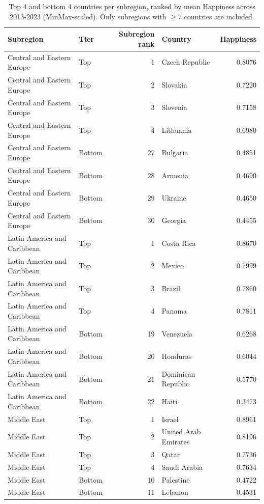 \begin{table}
\caption{Top 4 and bottom 4 countries per subregion, ranked by mean Happiness across 2013-2023 (MinMax-scaled). Only subregions with $\geq 7$ countries are included.}
\label{tab:top-bottom-sub}
\begin{tabular}{llrlr}
\toprule
Subregion & Tier & Subregion rank & Country & Happiness \\
\midrule
Central and Eastern Europe & Top & 1 & Czech Republic & 0.8076 \\
Central and Eastern Europe & Top & 2 & Slovakia & 0.7220 \\
Central and Eastern Europe & Top & 3 & Slovenia & 0.7158 \\
Central and Eastern Europe & Top & 4 & Lithuania & 0.6980 \\
Central and Eastern Europe & Bottom & 27 & Bulgaria & 0.4851 \\
Central and Eastern Europe & Bottom & 28 & Armenia & 0.4690 \\
Central and Eastern Europe & Bottom & 29 & Ukraine & 0.4650 \\
Central and Eastern Europe & Bottom & 30 & Georgia & 0.4455 \\
Latin America and Caribbean & Top & 1 & Costa Rica & 0.8670 \\
Latin America and Caribbean & Top & 2 & Mexico & 0.7999 \\
Latin America and Caribbean & Top & 3 & Brazil & 0.7860 \\
Latin America and Caribbean & Top & 4 & Panama & 0.7811 \\
Latin America and Caribbean & Bottom & 19 & Venezuela & 0.6268 \\
Latin America and Caribbean & Bottom & 20 & Honduras & 0.6044 \\
Latin America and Caribbean & Bottom & 21 & Dominican Republic & 0.5770 \\
Latin America and Caribbean & Bottom & 22 & Haiti & 0.3473 \\
Middle East & Top & 1 & Israel & 0.8961 \\
Middle East & Top & 2 & United Arab Emirates & 0.8196 \\
Middle East & Top & 3 & Qatar & 0.7736 \\
Middle East & Top & 4 & Saudi Arabia & 0.7634 \\
Middle East & Bottom & 10 & Palestine & 0.4722 \\
Middle East & Bottom & 11 & Lebanon & 0.4531 \\

\end{tabular}
\end{table}
